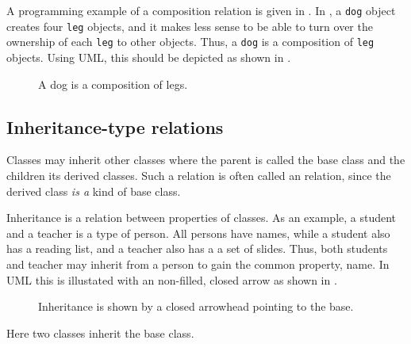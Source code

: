 \documentclass[fsharpNotes.tex]{subfiles}
\begin{document}
A programming example of a composition relation is given in .
% 
% 
In , a \lstinline{dog} object creates four \lstinline{leg} objects, and it makes less sense to be able to turn over the ownership of each \lstinline{leg} to other objects. Thus, a \lstinline{dog} is a composition of \lstinline{leg} objects. Using UML, this should be depicted as shown in .
\begin{figure}
  \centering
  \caption{A dog is a composition of legs.}
  \label{fig:umlCompositionUML}
\end{figure}

\subsection{Inheritance-type relations}
Classes may inherit other classes where the parent is called the base class and the children its derived classes. Such a relation is often called an  relation, since the derived class \emph{is a} kind of base class.

Inheritance is a relation between properties of classes. As an example, a student and a teacher is a type of person. All persons have names, while a student also has a reading list, and a teacher also has a a set of slides. Thus, both students and teacher may inherit from a person to gain the common property, name. In UML this is illustated with an non-filled, closed arrow as shown in .
\begin{figure}
  \centering
  \caption{Inheritance is shown by a closed arrowhead pointing to the base.}
  \label{fig:inherit}
\end{figure}
Here two classes inherit the base class.
\end{document}
